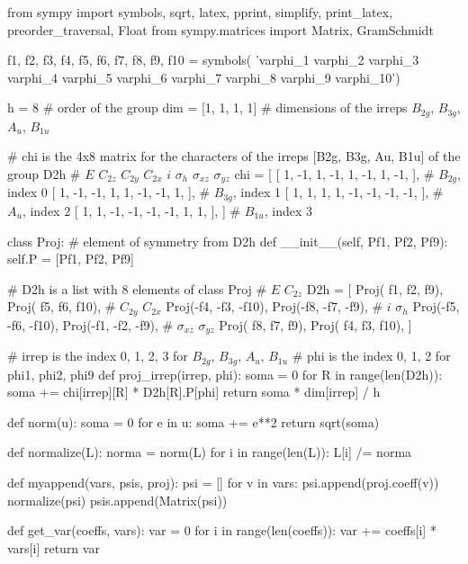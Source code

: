\documentclass[a4paper,10pt]{article}
\begin{document}
\begin{Python}
from sympy import symbols, sqrt, latex, pprint, simplify, print_latex, preorder_traversal, Float
from sympy.matrices import Matrix, GramSchmidt

f1, f2, f3, f4, f5, f6, f7, f8, f9, f10 = symbols(
'varphi_1 varphi_2 varphi_3 varphi_4 varphi_5 varphi_6 varphi_7 varphi_8 varphi_9 varphi_10')

h = 8   # order of the group
dim = [1, 1, 1, 1]  # dimensions of the irreps $B_{2g}$, $B_{3g}$, $A_{u}$, $B_{1u}$

# chi is the 4x8 matrix for the characters of the irreps [B2g, B3g, Au, B1u] of the group D2h
#         $E$  $C_{2z}$  $C_{2y}$  $C_{2x}$   $i$   $\sigma_h$   $\sigma_{xz}$  $\sigma_{yz}$
chi = [ [ 1,  -1,   1,   -1,    1,  -1,   1,   -1,    ],     #  $B_{2g}$, index 0
        [ 1,  -1,  -1,    1,    1,  -1,  -1,    1,    ],     #  $B_{3g}$, index 1
        [ 1,   1,   1,    1,   -1,  -1,  -1,   -1,    ],     #  $A_{u}$, index 2
        [ 1,   1,  -1,   -1,   -1,  -1,   1,    1,    ], ]   #  $B_{1u}$, index 3

class Proj:     # element of symmetry from D2h
    def __init__(self, Pf1, Pf2, Pf9):
        self.P = [Pf1, Pf2, Pf9]

# D2h is a list with 8 elements of class Proj
#             $E$                   $C_{2z}$
D2h = [ Proj( f1,  f2, f9),   Proj( f5,  f6, f10),
#             $C_{2y}$                 $C_{2x}$
        Proj(-f4, -f3, -f10), Proj(-f8, -f7, -f9),
#             $i$                    $\sigma_h$
        Proj(-f5, -f6, -f10), Proj(-f1, -f2, -f9),
#            $\sigma_{xz}$                   $\sigma_{yz}$
        Proj( f8,  f7, f9),   Proj( f4,  f3, f10),  ]

# irrep is the index 0, 1, 2, 3 for $B_{2g}$, $B_{3g}$, $A_{u}$, $B_{1u}$
# phi is the index 0, 1, 2 for phi1, phi2, phi9
def proj_irrep(irrep, phi):
    soma = 0
    for R in range(len(D2h)):
        soma += chi[irrep][R] * D2h[R].P[phi]
    return soma * dim[irrep] / h

def norm(u):
    soma = 0
    for e in u:
        soma += e**2
    return sqrt(soma)

def normalize(L):
    norma = norm(L)
    for i in range(len(L)):
        L[i] /= norma

def myappend(vars, psis, proj):
    psi = []
    for v in vars:
        psi.append(proj.coeff(v))
    normalize(psi)
    psis.append(Matrix(psi))

def get_var(coeffs, vars):
    var = 0
    for i in range(len(coeffs)):
        var += coeffs[i] * vars[i]
    return var
\end{Python}
\end{document}

